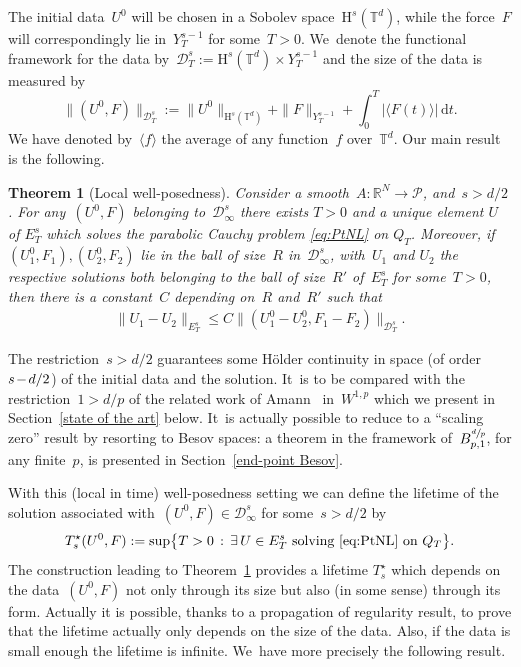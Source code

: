 \documentclass[10pt]{amsart}
\newtheorem{thm}{Theorem}
\theoremstyle{definition}
\newcommand\R{\mathbb{R}}
\newcommand\T{\mathbb{T}}
\newcommand\dd{\mathrm{d}}
\renewcommand\H{\mathrm{H}}
\begin{document}
The initial data~$U^0 $ will be chosen in a Sobolev space~$ \H^s(\T^d)$, while the force~$F$ will correspondingly lie in~$ Y_T^{s-1}$ for some~$T>0$. We~denote the functional framework for the data by~$
\mathcal D_T^s:= \H^s(\T^d) \times Y_T^{s-1}
$
and the size of the data is measured by
\[
\|(U^0,F)\|_{ \mathcal D_T^s}:= \|U^0\|_{\H^s(\T^d)} + \|F\|_{Y_T^{s-1}} + \int_0^T \left|\langle F(t)\rangle\right|\,\dd t.
\]
We have denoted by~$ \langle f\rangle$ the average of any function~$f$ over~$\T^d$.
Our main result is the following.
\begin{thm}[Local well-posedness] \label{thm:exloc}
Consider a smooth~$A:\R^N\to \mathscr{P}$, and~$s>d/2$. For any~$(U^0,F)$ belonging to~$\mathcal D_\infty^s$ there exists $T>0$ and a unique element $U$ of $E_T^s$ which solves the parabolic Cauchy problem \eqref{eq:PtNL} on $Q_T$. Moreover, if $(U^0_1,F_1),(U^0_2,F_2)$ lie in the ball of size~$R$ in~$\mathcal D_\infty^s$, with~$U_1$ and $U_2$ the respective solutions both belonging to the ball of size~$R'$ of~$E_T^s$ for some~$T>0$, then there is a constant~$C $ depending on~$R$ and~$R'$ such that
\begin{align}\label{eq:stabNL}
\|U_1-U_2\|_{E_T^s} \leq C \big \|(U^0_1-U^0_2,F_1-F_2)\big\|_{ \mathcal D_T^s}.
\end{align}
\end{thm}

The restriction~$s\!>\!d/2$ guarantees some H\"older continuity in space (of order $s\mkern-2mu-\mkern-2mu d/2$) of the initial data and the solution. It~is to be compared with the restriction~$1>d/p$ of the related work of Amann~\cite{amann} in~$W^{1,p}$ which we present in Section~\ref{state of the art} below. It~is actually possible to reduce to a ``scaling zero'' result by resorting to Besov spaces: a theorem in the framework of~$B^{\sfrac dp}_{p,1}$, for any finite~$p$, is presented in Section~\ref{end-point Besov}.

With this (local in time) well-posedness setting we can define the lifetime of the solution associated with~$(U^0,F)\in \mathcal D_\infty^s$ for some~$s>d/2$ by
\[
T^\star_s(U^0,F):= \sup \bigl\{T>0\,:\, \exists\, U \in E_T^s\textnormal{ solving \eqref{eq:PtNL} on } Q_T\bigr\}.
\]
The construction leading to Theorem~\ref{thm:exloc} provides a lifetime $T^\star_s$ which depends on the data~$(U^0,F)$ not only through its size but also (in some sense) through its form. Actually
it is possible, thanks to a propagation of regularity result, to prove that the lifetime actually only depends on the size of the data.
Also, if the data is small enough the lifetime is infinite. We~have more precisely the following result.
\end{document}
